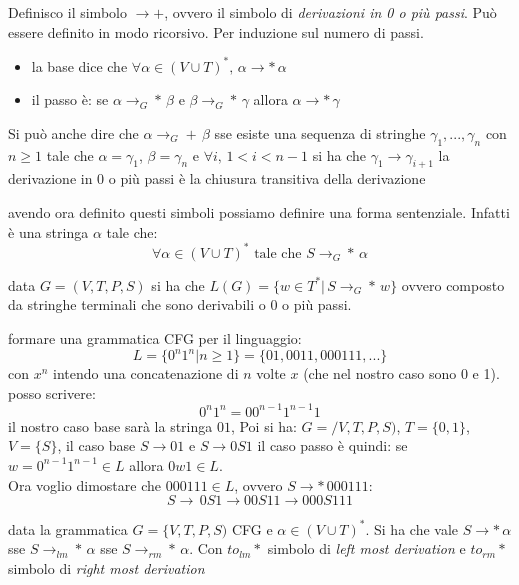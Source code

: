 \documentclass[a4paper,12pt, oneside]{book}
\begin{document}
\begin{definizione}
Definisco il simbolo $\to +$, ovvero il simbolo di \textit{derivazioni in 0 o più passi}. Può essere definito in modo ricorsivo. Per induzione sul numero di passi. 

\begin{itemize}
\item la base dice che  $\forall \alpha\in (V\cup T)^*,\, \alpha\to * \,\alpha$
\item il passo è: se $\alpha\to_G * \,\beta $ e $ \beta \to_G * \,\gamma$ allora $\alpha\to * \,\gamma$
\end{itemize}
Si può anche dire che $\alpha\to_G +\, \beta$ sse esiste una sequenza di stringhe $\gamma_1,...,\gamma_n$ con $n\geq 1$ tale che $\alpha=\gamma_1$, $\beta=\gamma_n$ e $\forall i,\, 1<i<n-1$ si ha che $\gamma_1\to \gamma_{i+1}$
la derivazione in 0 o più passi è la chiusura transitiva della derivazione
\end{definizione}
\begin{definizione}
avendo ora definito questi simboli possiamo definire una forma sentenziale. Infatti è una stringa $\alpha$ tale che:
$$\forall \alpha\in (V\cup T)^* \mbox{ tale che }S\to_G *\, \alpha$$
\end{definizione}
\begin{definizione}
data $G=(V,T,P,S)$ si ha che $L(G)=\{w\in T^* |\, S\to_G *\, w\}$ ovvero composto da stringhe terminali che sono derivabili o 0 o più passi.
\end{definizione}
\begin{esempio}
formare una grammatica CFG per il linguaggio:
$$L=\{0^n 1^n| n\geq 1\}=\{01, 0011, 000111,...\}$$
con $x^n$ intendo una concatenazione di $n$ volte $x$ (che nel nostro caso sono 0 e 1).\\
posso scrivere:
$$0^n 1^n =00^{n-1} 1^{n-1}1$$
il nostro caso base sarà la stringa $01$, Poi si ha:
$G=/V,T,P,S)$, $T=\{0,1\}$, $V=\{S\}$, il caso base $S\to 01$  e $S\to 0S1$
il caso passo è quindi: se $w= 0^{n-1}1^{n-1}\in L$ allora $0w1\in L$.\\
Ora voglio dimostare che $000111\in L$, ovvero $S\to*\, 000111$:\\
$$S\to\, 0S1 \to 00S11\to 000S111$$
\end{esempio}
\begin{teorema}
data la grammatica $G=\{V,T,P,S)$ CFG e $\alpha\in (V\cup T)^*$. Si ha che vale $S\to*\, \alpha$ sse $S\to_{lm}*\, \alpha$ sse $S\to_{rm}*\, \alpha$. Con $to_{lm}*$ simbolo di \textit{left most derivation }e $to_{rm}*$ simbolo di \textit{right most derivation }
\end{teorema}
\end{document}
